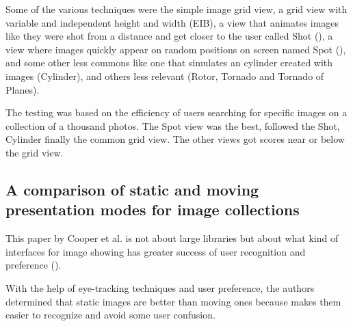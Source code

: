 Some of the various techniques were the simple image grid view, a grid view with variable and independent height and width (EIB), a view that animates images like they were shot from a distance and get closer to the user called Shot (), a view where images quickly appear on random positions on screen named Spot (), and some other less commons like one that simulates an cylinder created with images (Cylinder), and others less relevant (Rotor, Tornado and Tornado of Planes).

The testing was based on the efficiency of users searching for specific images on a collection of a thousand photos. The Spot view was the best, followed the Shot, Cylinder finally the common grid view. The other views got scores near or below the grid view.


\subsection{A comparison of static and moving presentation modes for image collections} %
\label{sub:Cooper}

This paper by Cooper et al. \cite{Cooper:2006p543} is not about large libraries but about what kind of interfaces for image showing has greater success of user recognition and preference ().

With the help of eye-tracking techniques and user preference, the authors determined that static images are better than moving ones because makes them easier to recognize and avoid some user confusion.

